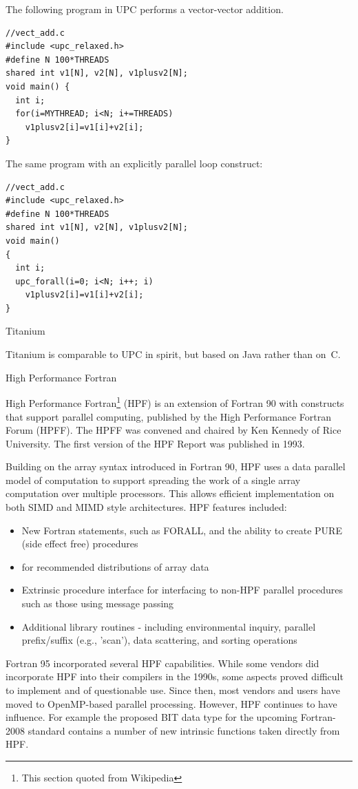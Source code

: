 The following program in \ac{UPC} performs a vector-vector addition.
\begin{verbatim}
//vect_add.c
#include <upc_relaxed.h>
#define N 100*THREADS
shared int v1[N], v2[N], v1plusv2[N];
void main() {
  int i;
  for(i=MYTHREAD; i<N; i+=THREADS)
    v1plusv2[i]=v1[i]+v2[i];
}
\end{verbatim}
The same program with an explicitly parallel loop construct:
\begin{verbatim}
//vect_add.c
#include <upc_relaxed.h>
#define N 100*THREADS
shared int v1[N], v2[N], v1plusv2[N];
void main()
{
  int i;
  upc_forall(i=0; i<N; i++; i)
    v1plusv2[i]=v1[i]+v2[i];
}
\end{verbatim}


 {Titanium}

Titanium is comparable to \ac{UPC} in spirit, but based on Java rather
than on~C.

 {High Performance Fortran}
\label{sec:HPF}

High Performance Fortran\footnote{This section quoted from Wikipedia}
(HPF) is an extension of Fortran 90 with constructs that support
parallel computing, published by the High Performance Fortran Forum
(HPFF). The HPFF was convened and chaired by Ken Kennedy of Rice
University. The first version of the HPF Report was published in 1993.

Building on the array syntax introduced in Fortran 90, HPF uses a data
parallel model of computation to support spreading the work of a
single array computation over multiple processors. This allows
efficient implementation on both SIMD and MIMD style
architectures. HPF features included:
\begin{itemize}
\item New Fortran statements, such as FORALL, and the ability to
  create PURE (side effect free) procedures
\item {} for recommended
  distributions of array data
\item Extrinsic procedure interface for interfacing to non-HPF
  parallel procedures such as those using message passing
\item Additional library routines - including environmental inquiry,
  parallel prefix/suffix (e.g., 'scan'), data scattering, and sorting
  operations
\end{itemize}
Fortran 95 incorporated several HPF capabilities.  While some vendors
did incorporate HPF into their compilers in the 1990s, some aspects
proved difficult to implement and of questionable use. Since then,
most vendors and users have moved to OpenMP-based parallel
processing. However, HPF continues to have
influence. For example the proposed BIT data type for the upcoming
Fortran-2008 standard contains a number of new intrinsic functions
taken directly from HPF.

